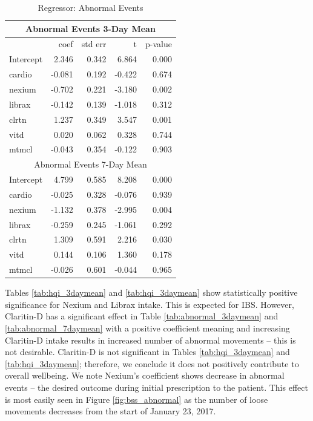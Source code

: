 \documentclass[conference]{IEEEtran}
\begin{document}
\begin{table}
\begin{center}
\caption{Regressor: Abnormal Events} \label{tab:abnormal_events}
    \begin{tabular}{ | l | r | r | r | r |}
    \hline
    \multicolumn{5}{|c|}{Abnormal Events 3-Day Mean} \\
    \hline
     & coef & std err & t & p-value \\ \hline
Intercept & 2.346 & 0.342 & 6.864 & 0.000 \\
cardio & -0.081 & 0.192 & -0.422 & 0.674 \\
nexium & -0.702 & 0.221 & -3.180 & 0.002 \\
librax & -0.142 & 0.139 & -1.018 & 0.312 \\
clrtn & 1.237 & 0.349 & 3.547 & 0.001 \\
vitd & 0.020 & 0.062 & 0.328 & 0.744 \\
mtmcl & -0.043 & 0.354 & -0.122 & 0.903 \\
    \hline
    \multicolumn{5}{|c|}{Abnormal Events 7-Day Mean} \\
    \hline
Intercept & 4.799 & 0.585 & 8.208 & 0.000 \\
cardio & -0.025 & 0.328 & -0.076 & 0.939 \\
nexium & -1.132 & 0.378 & -2.995 & 0.004 \\
librax & -0.259 & 0.245 & -1.061 & 0.292 \\
clrtn & 1.309 & 0.591 & 2.216 & 0.030 \\
vitd & 0.144 & 0.106 & 1.360 & 0.178 \\
mtmcl & -0.026 & 0.601 & -0.044 & 0.965 \\
    \hline
    \end{tabular}
\end{center}
\end{table}

Tables \ref{tab:hqi_3daymean} and \ref{tab:hqi_3daymean} show statistically positive significance for Nexium and Librax intake.  This is expected for IBS.  However, Claritin-D has a significant effect in Table \ref{tab:abnormal_3daymean} and \ref{tab:abnormal_7daymean} with a positive coefficient  meaning and increasing Claritin-D intake results in increased number of abnormal movements -- this is not desirable. Claritin-D is not significant in Tables \ref{tab:hqi_3daymean} and \ref{tab:hqi_3daymean}; therefore, we conclude it does not positively contribute to overall wellbeing.  We note Nexium's coefficient shows decrease in abnormal events -- the desired outcome during initial prescription to the patient.  This effect is most easily seen in Figure \ref{fig:bss_abnormal} as the number of loose movements decreases from the start of January 23, 2017.
\end{document}
